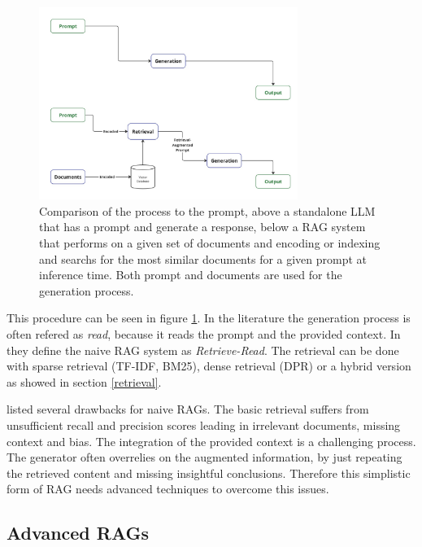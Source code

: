 \begin{figure}[h!]
    \centering
    \includegraphics[width=0.75\textwidth]{images/LLM-vs-RAG.jpg}
    \caption{Comparison of the process to the prompt, above a standalone LLM that has a prompt and generate a response, below a RAG system that performs on a given set of documents and encoding or indexing and searchs for the most similar documents for a given prompt at inference time. Both prompt and documents are used for the generation process.}
    \label{fig:naive_rag}
\end{figure}

This procedure can be seen in figure \ref{fig:naive_rag}. In the literature the generation process is often refered as \textit{read}, because it reads the prompt and the provided context. In \citet{Gao.18.12.2023} they define the naive RAG system as \textit{Retrieve-Read}. The retrieval can be done with sparse retrieval (TF-IDF, BM25), dense retrieval (DPR) or a hybrid version as showed in section \ref{retrieval}. 

\citet{Gao.18.12.2023} listed several drawbacks for naive RAGs. The basic retrieval suffers from unsufficient recall and precision scores leading in irrelevant documents, missing context and bias. The integration of the provided context is a challenging process. The generator often overrelies on the augmented information, by just repeating the retrieved content and missing insightful conclusions. Therefore this simplistic form of RAG needs advanced techniques to overcome this issues. 

\subsection{Advanced RAGs}
\label{sec:advanced_rags}



